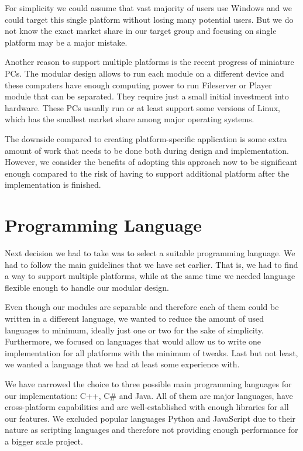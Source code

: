 For simplicity we could assume that vast majority of users use Windows and we could target this single platform without losing many potential users. But we do not know the exact market share in our target group and focusing on single platform may be a major mistake.
\par
Another reason to support multiple platforms is the recent progress of miniature PCs. The modular design allows to run each module on a different device and these computers have enough computing power to run Fileserver or Player module that can be separated. They require just a small initial investment into hardware. These PCs usually run or at least support some versions of Linux, which has the smallest market share among major operating systems.
\par
The downside compared to creating platform-specific application is some extra amount of work that needs to be done both during design and implementation. However, we consider the benefits of adopting this approach now to be significant enough compared to the risk of having to support additional platform after the implementation is finished.

\section{Programming Language}

Next decision we had to take was to select a suitable programming language. We had to follow the main guidelines that we have set earlier. That is, we had to find a way to support multiple platforms, while at the same time we needed language flexible enough to handle our modular design.
\par
Even though our modules are separable and therefore each of them could be written in a different language, we wanted to reduce the amount of used languages to minimum, ideally just one or two for the sake of simplicity. Furthermore, we focused on languages that would allow us to write one implementation for all platforms with the minimum of tweaks. Last but not least, we wanted a language that we had at least some experience with.
\par
We have narrowed the choice to three possible main programming languages for our implementation: C++, C\# and Java. All of them are major languages, have cross-platform capabilities and are well-established with enough libraries for all our features. We excluded popular languages Python and JavaScript due to their nature as scripting languages and therefore not providing enough performance for a bigger scale project.

